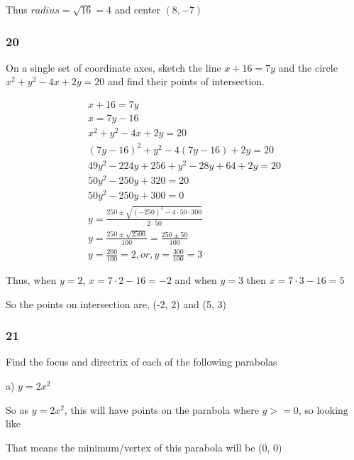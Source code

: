 \documentclass[]{report}
\begin{document}
Thus $radius = \sqrt{16} = 4$ and center $(8, -7)$

\subsubsection{20}

On a single set of coordinate axes, sketch the line $x + 16 = 7y$ and the circle $x^2 + y^2 - 4x + 2y = 20$ and find their points of intersection.

\begin{align*}
	x + 16 = 7y \tag{1} \\
	x = 7y - 16 \tag{rearranging} \\
	x^2 + y^2 - 4x + 2y = 20  \tag{2} \\
	(7y - 16)^2 + y^2 - 4(7y -16) + 2y = 20 \tag{eliminating x} \\
	49y^2 - 224y + 256 + y^2 - 28y  + 64 + 2y = 20 \tag{expanding} \\
	50y^2 - 250y + 320 = 20 \\
	50y^2 - 250y + 300 = 0 \\
	y = \frac{250 \pm \sqrt{(-250)^2 - 4 \cdot 50 \cdot 300}}{2 \cdot 50} \\
	y = \frac{250 \pm \sqrt{2500}}{100} = \frac{250 \pm 50}{100}\\
	y = \frac{200}{100} = 2, or, y = \frac{300}{100} = 3
\end{align*}

Thus, when $y = 2$, $x = 7\cdot 2 - 16 = -2$ and when $y = 3$ then $x = 7\cdot 3 -16 = 5$

So the points on intersection are, (-2, 2) and (5, 3)


\subsubsection{21}
Find the focus and directrix of each of the following parabolas

a) $ y = 2x^2$

So as $ y = 2x^2$, this will have points on the parabola where $ y >= 0$, so looking like 


That means the minimum/vertex of this parabola will be (0, 0)
\end{document}
